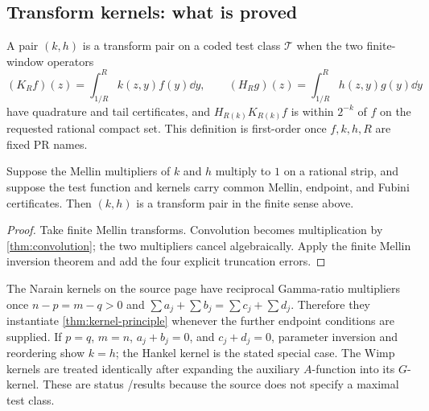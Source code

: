 \subsection{Transform kernels: what is proved}

A pair $(k,h)$ is a transform pair on a coded test class $\mathcal T$ when the
two finite-window operators
\[
 (K_Rf)(z)=\int_{1/R}^{R}k(z,y)f(y)\dd y,
 \qquad
 (H_Rg)(z)=\int_{1/R}^{R}h(z,y)g(y)\dd y
\]
have quadrature and tail certificates, and
$H_{R(k)}K_{R(k)}f$ is within $2^{-k}$ of $f$ on the requested rational compact
set.  This definition is first-order once $f,k,h,R$ are fixed PR names.

\begin{theorem}\label{thm:kernel-principle}
Suppose the Mellin multipliers of $k$ and $h$ multiply to $1$ on a rational
strip, and suppose the test function and kernels carry common Mellin, endpoint,
and Fubini certificates.  Then $(k,h)$ is a transform pair in the finite sense
above.
\end{theorem}
\begin{proof}
Take finite Mellin transforms.  Convolution becomes multiplication by
\cref{thm:convolution}; the two multipliers cancel algebraically.  Apply the
finite Mellin inversion theorem and add the four explicit truncation errors.
\end{proof}

The Narain kernels on the source page have reciprocal Gamma-ratio multipliers
once
$n-p=m-q>0$ and
$\sum a_j+\sum b_j=\sum c_j+\sum d_j$.  Therefore they instantiate
\cref{thm:kernel-principle} whenever the further endpoint conditions are
supplied.  If $p=q$, $m=n$, $a_j+b_j=0$, and $c_j+d_j=0$, parameter inversion
and reordering show $k=h$; the Hankel kernel is the stated special case.  The
Wimp kernels are treated identically after expanding the auxiliary $A$-function
into its $G$-kernel.  These are status \statusQ/\statusR results because the
source does not specify a maximal test class.

